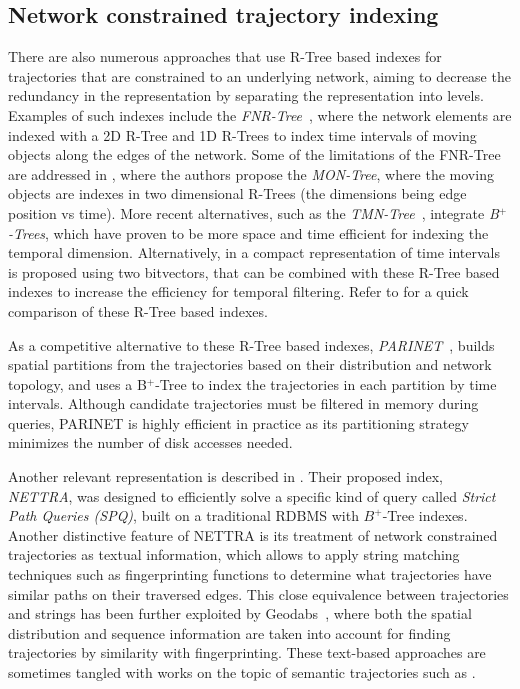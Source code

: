 \documentclass[a4paper,10pt,twoside]{book}
\begin{document}
	\subsection{Network constrained trajectory indexing}
	There are also numerous approaches that use R-Tree based indexes for trajectories that are constrained to an underlying network, aiming to decrease the redundancy in the representation by separating the representation into levels. Examples of such indexes include the {\em FNR-Tree}~\cite{DBLP:conf/ssd/Frentzos03}, where the network elements are indexed with a 2D R-Tree and 1D R-Trees to index time intervals of moving objects along the edges of the network. Some of the limitations of the FNR-Tree are addressed in \cite{DBLP:journals/geoinformatica/AlmeidaG05}, where the authors propose the {\em MON-Tree}, where the moving objects are indexes in two dimensional R-Trees (the dimensions being edge position vs time). More recent alternatives, such as the {\em TMN-Tree}~\cite{chang2010tmn}, integrate {\em B$^+$-Trees}, which have proven to be more space and time efficient for indexing the temporal dimension. Alternatively, in \cite{rivera2018faster} a compact representation of time intervals is proposed using two bitvectors, that can be combined with these R-Tree based indexes to increase the efficiency for temporal filtering. Refer to \cite{john2017performance} for a quick comparison of these R-Tree based indexes.

    As a competitive alternative to these R-Tree based indexes, {\em PARINET}~\cite{DBLP:journals/vldb/PopaZOBV11}, builds spatial partitions from the trajectories based on their distribution and network topology, and uses a B$^+$-Tree to index the trajectories in each partition by time intervals. Although candidate trajectories must be filtered in memory during queries, PARINET is highly efficient in practice as its partitioning strategy minimizes the number of disk accesses needed.
    
    Another relevant representation is described in \cite{DBLP:conf/gis/KroghPTT14}. Their proposed index, {\em NETTRA}, was designed to efficiently solve a specific kind of query called {\em Strict Path Queries (SPQ)}, built on a traditional RDBMS with $B^+$-Tree indexes. Another distinctive feature of NETTRA is its treatment of network constrained trajectories as textual information, which allows to apply string matching techniques such as fingerprinting functions to determine what trajectories have similar paths on their traversed edges. This close equivalence between trajectories and strings has been further exploited by Geodabs~\cite{chapuis2018geodabs}, where both the spatial distribution and sequence information are taken into account for finding trajectories by similarity with fingerprinting. These text-based approaches are sometimes tangled with works on the topic of semantic trajectories such as \cite{al2017semantictraj}.
    
\end{document}
